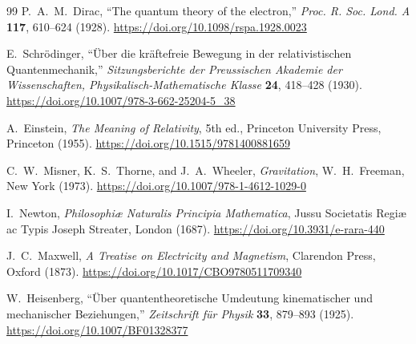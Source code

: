 \documentclass[%
 reprint,
 amsmath,amssymb,
 aps,
]{revtex4-1}
\numberwithin{equation}{section}%
\begin{document}
\begin{thebibliography}{99}
P.~A.~M.~Dirac, 
``The quantum theory of the electron,'' 
\textit{Proc. R. Soc. Lond. A} \textbf{117}, 610--624 (1928). 
\href{https://doi.org/10.1098/rspa.1928.0023}{https://doi.org/10.1098/rspa.1928.0023}

E.~Schrödinger, 
``Über die kräftefreie Bewegung in der relativistischen Quantenmechanik,'' 
\textit{Sitzungsberichte der Preussischen Akademie der Wissenschaften, Physikalisch-Mathematische Klasse} \textbf{24}, 418--428 (1930).
\href{https://doi.org/10.1007/978-3-662-25204-5_38}{https://doi.org/10.1007/978-3-662-25204-5\_38}

A.~Einstein, 
\textit{The Meaning of Relativity}, 
5th ed., Princeton University Press, Princeton (1955).
\href{https://doi.org/10.1515/9781400881659}{https://doi.org/10.1515/9781400881659}

C.~W.~Misner, K.~S.~Thorne, and J.~A.~Wheeler, 
\textit{Gravitation}, 
W.~H.~Freeman, New York (1973).
\href{https://doi.org/10.1007/978-1-4612-1029-0}{https://doi.org/10.1007/978-1-4612-1029-0}

I.~Newton, 
\textit{Philosophiæ Naturalis Principia Mathematica}, 
Jussu Societatis Regiæ ac Typis Joseph Streater, London (1687).
\href{https://doi.org/10.3931/e-rara-440}{https://doi.org/10.3931/e-rara-440}

J.~C.~Maxwell, 
\textit{A Treatise on Electricity and Magnetism}, 
Clarendon Press, Oxford (1873).
\href{https://doi.org/10.1017/CBO9780511709340}{https://doi.org/10.1017/CBO9780511709340}

W.~Heisenberg, 
``Über quantentheoretische Umdeutung kinematischer und mechanischer Beziehungen,'' 
\textit{Zeitschrift für Physik} \textbf{33}, 879--893 (1925).
\href{https://doi.org/10.1007/BF01328377}{https://doi.org/10.1007/BF01328377}


\end{thebibliography}
\end{document}
